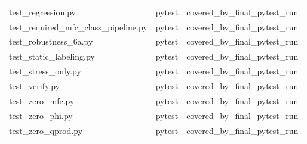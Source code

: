 \begin{table}[!htbp]
\begin{tabular}{lll}
test\_regression.py & pytest & covered\_by\_final\_pytest\_run \\
test\_required\_mfc\_class\_pipeline.py & pytest & covered\_by\_final\_pytest\_run \\
test\_robustness\_6a.py & pytest & covered\_by\_final\_pytest\_run \\
test\_static\_labeling.py & pytest & covered\_by\_final\_pytest\_run \\
test\_stress\_only.py & pytest & covered\_by\_final\_pytest\_run \\
test\_verify.py & pytest & covered\_by\_final\_pytest\_run \\
test\_zero\_mfc.py & pytest & covered\_by\_final\_pytest\_run \\
test\_zero\_phi.py & pytest & covered\_by\_final\_pytest\_run \\
test\_zero\_qprod.py & pytest & covered\_by\_final\_pytest\_run \\
\bottomrule
\end{tabular}
\end{table}
